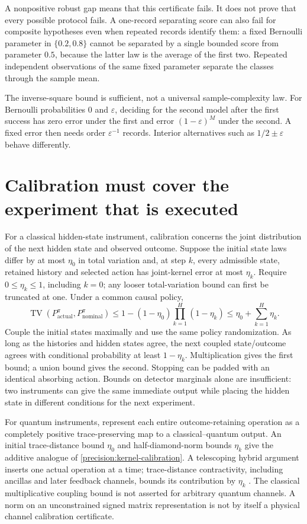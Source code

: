 A nonpositive robust gap means that this certificate fails. It does not prove
that every possible protocol fails. A one-record separating score can also fail
for composite hypotheses even when repeated records identify them: a fixed
Bernoulli parameter in $\{0.2,0.8\}$ cannot be separated by a single bounded
score from parameter $0.5$, because the latter law is the average of the first
two. Repeated independent observations of the same fixed parameter separate
the classes through the sample mean.

The inverse-square bound is sufficient, not a universal sample-complexity law.
For Bernoulli probabilities $0$ and $\varepsilon$, deciding for the second
model after the first success has zero error under the first and error
$(1-\varepsilon)^M$ under the second. A fixed error then needs order
$\varepsilon^{-1}$ records. Interior alternatives such as
$1/2\pm\varepsilon$ behave differently.

\section{Calibration must cover the experiment that is executed}

For a classical hidden-state instrument, calibration concerns the joint
distribution of the next hidden state and observed outcome. Suppose the initial
state laws differ by at most $\eta_0$ in total variation and, at step $k$, every
admissible state, retained history and selected action has joint-kernel error
at most $\eta_k$. Require $0\leq\eta_k\leq1$, including $k=0$; any looser
total-variation bound can first be truncated at one. Under a common causal policy,
\begin{equation}
 \operatorname{TV}(P_{\mathrm{actual}}^\pi,P_{\mathrm{nominal}}^\pi)
 \leq 1-(1-\eta_0)\prod_{k=1}^H(1-\eta_k)
 \leq\eta_0+\sum_{k=1}^H\eta_k.
 \label{precision:kernel-calibration}
\end{equation}
Couple the initial states maximally and use the same policy randomization. As
long as the histories and hidden states agree, the next coupled state/outcome
agrees with conditional probability at least $1-\eta_k$. Multiplication gives
the first bound; a union bound gives the second. Stopping can be padded with an
identical absorbing action. Bounds on detector marginals alone are insufficient:
two instruments can give the same immediate output while placing the hidden
state in different conditions for the next experiment.

For quantum instruments, represent each entire outcome-retaining operation as a
completely positive trace-preserving map to a classical--quantum output. An
initial trace-distance bound $\eta_0$ and half-diamond-norm bounds $\eta_k$
give the additive analogue of \eqref{precision:kernel-calibration}. A telescoping
hybrid argument inserts one actual operation at a time; trace-distance
contractivity, including ancillas and later feedback channels, bounds its
contribution by $\eta_k$ \cite{caWatrous2018}. The classical multiplicative
coupling bound is not asserted for arbitrary quantum channels. A norm on an
unconstrained signed matrix representation is not by itself a physical channel
calibration certificate.

